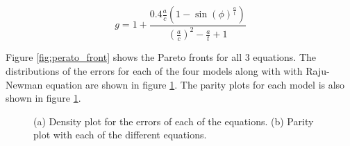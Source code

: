 \begin{equation} \label{eqn:Bingo_g_balance}
    g = 1 + \frac{0.4 \frac{a}{c}\left(1 - \sin\left(\phi\right) ^ \frac{a}{t} \right)}{\left( \frac{a}{c} \right) ^ 2 - \frac{a}{t} + 1}
\end{equation}

Figure \ref{fig:perato_front} shows the Pareto fronts for all 3 equations. The distributions of the errors for each of the four models along with with Raju-Newman equation are shown in figure \ref{fig:error_plots}. The parity plots for each model is also shown in figure \ref{fig:error_plots}.
\begin{figure}%
    \centering
    \qquad
    \caption{(a) Density plot for the errors of each of the equations. (b) Parity plot with each of the different equations.}%
    \label{fig:error_plots}%
\end{figure}

